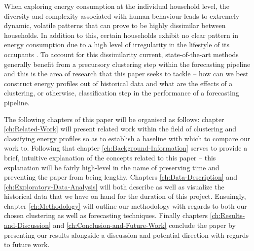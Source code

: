 \noindent \newline When exploring energy consumption at the individual household level, the diversity and complexity associated with human behaviour leads to extremely dynamic, volatile patterns that can prove to be highly dissimilar between households. In addition to this, certain households exhibit no clear pattern in energy consumption due to a high level of irregularity in the lifestyle of its occupants \cite{Kong}. To account for this dissimilarity current, state-of-the-art methods generally benefit from a precursory clustering step within the forecasting pipeline \cite{Yildiz, Kong, Hsiao} and this is the area of research that this paper seeks to tackle -- how can we best construct energy profiles out of historical data and what are the effects of a clustering, or otherwise, classification step in the performance of a forecasting pipeline.

\noindent \newline The following chapters of this paper will be organised as follows: chapter \ref{ch:Related-Work} will present related work within the field of clustering and classifying energy profiles so as to establish a baseline with which to compare our work to. Following that chapter \ref{ch:Background-Information} serves to provide a brief, intuitive explanation of the concepts related to this paper -- this explanation will be fairly high-level in the name of preserving time and preventing the paper from being lengthy. Chapters \ref{ch:Data-Description} and \ref{ch:Exploratory-Data-Analysis} will both describe as well as visualize the historical data that we have on hand for the duration of this project. Ensuingly, chapter \ref{ch:Methodology} will outline our methodology with regards to both our chosen clustering as well as forecasting techniques. Finally chapters \ref{ch:Results-and-Discussion} and \ref{ch:Conclusion-and-Future-Work} conclude the paper by presenting our results alongside a discussion and potential direction with regards to future work.
